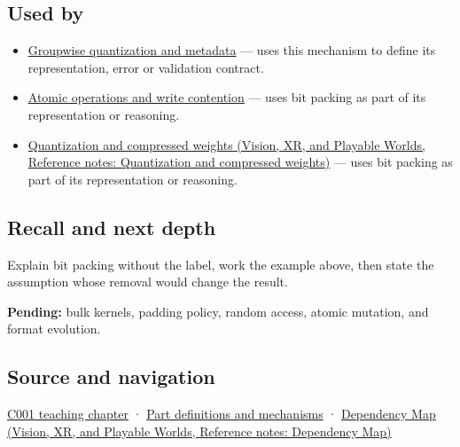 \subsection{Used by}\label{appendix-1f9963e1a5d1-used-by}

\hypertarget{appendix-1f9963e1a5d1-used-by}{}

\begin{itemize}
\item
  \hyperref[appendix-638204c40e8b]{Groupwise quantization and metadata} --- uses this mechanism to define its representation, error or validation contract.
\item
  \hyperref[appendix-e12d1b03fefb]{Atomic operations and write contention} --- uses bit packing as part of its representation or reasoning.
\item
  \href{../07-Vision-XR-and-Playable-Worlds/main.pdf\#nameddest=appendix-fdc7879e8bf2}{Quantization and compressed weights (Vision, XR, and Playable Worlds, Reference notes: Quantization and compressed weights)} --- uses bit packing as part of its representation or reasoning.
\end{itemize}

\subsection{Recall and next depth}\label{appendix-1f9963e1a5d1-recall-and-next-depth}

\hypertarget{appendix-1f9963e1a5d1-recall-and-next-depth}{}

Explain bit packing without the label, work the example above, then state the assumption whose removal would change the result.

\textbf{Pending:} bulk kernels, padding policy, random access, atomic mutation, and format evolution.

\subsection{Source and navigation}\label{appendix-1f9963e1a5d1-source-and-navigation}

\hypertarget{appendix-1f9963e1a5d1-source-and-navigation}{}

\hyperref[01-foundations-i-ch001-from-a-signal-to-an-interpretation]{C001 teaching chapter} · \hyperref[appendix-fd090d982a15]{Part definitions and mechanisms} · \href{../07-Vision-XR-and-Playable-Worlds/main.pdf\#nameddest=appendix-4ad47bdd269a}{Dependency Map (Vision, XR, and Playable Worlds, Reference notes: Dependency Map)}
